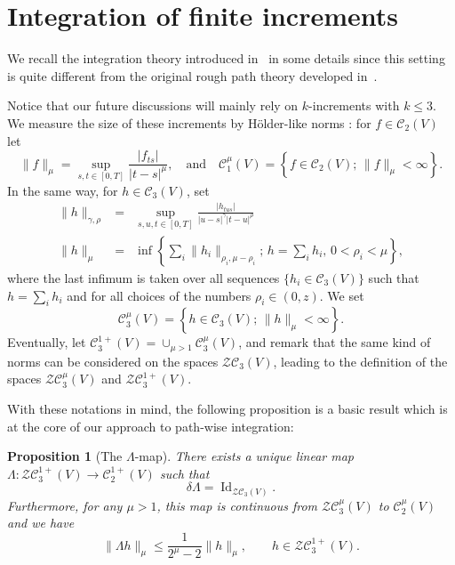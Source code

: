 \documentclass[a4paper,11pt,reqno]{article}
\newcommand{\cZ}{\mathcal{Z}}
\newcommand{\ott}{[0,T]}
\newcommand{\1}{{\bf 1}}
\DeclareMathOperator{\id}{\text{Id}}
\newcommand{\CC}{\mathcal{C}}
\newcommand{\norm}[1]{\lVert #1\rVert}
\newcommand{\lcl}{\left\{}
\newcommand{\rcl}{\right\}}
\newtheorem{proposition}[theorem]{Proposition}
\begin{document}
\section{Integration of finite increments}
\label{sec:one-dim}

We recall the integration theory introduced in~\cite{MR2091358} in
some details since this
setting is quite different from the original rough path
theory developed in~\cite{MR2036784,MR1654527}.

Notice that our future discussions will mainly rely on
$k$-increments with $k \le 3$. We measure the size of these increments by H\"older-like norms
: for $f \in \CC_2(V)$ let
$$
\norm{f}_{\mu} =
\sup_{s,t\in\ott}\frac{|f_{ts}|}{|t-s|^\mu},
\quad\mbox{and}\quad
\CC_1^\mu(V)=\lcl f \in \CC_2(V);\, \norm{f}_{\mu}<\infty  \rcl.
$$
In the same way, for $h \in \CC_3(V)$, set
\begin{eqnarray}
  \label{eq:normOCC2}
  \norm{h}_{\gamma,\rho} &=& \sup_{s,u,t\in\ott} 
\frac{|h_{tus}|}{|u-s|^\gamma |t-u|^\rho}\\
\|h\|_\mu &= &
\inf\left \{\sum_i \|h_i\|_{\rho_i,\mu-\rho_i} ;\, h =
 \sum_i h_i,\, 0 < \rho_i < \mu \right\} ,\nonumber
\end{eqnarray}
where the last infimum is taken over all sequences $\{h_i \in \CC_3(V) \}$ such that $h
= \sum_i h_i$ and for all choices of the numbers $\rho_i \in (0,z)$.
 We set
$$
\CC_3^\mu(V)=\lcl h\in\CC_3(V);\, \|h\|_\mu<\infty \rcl.
$$
Eventually,
let $\CC_3^{1+}(V) = \cup_{\mu > 1} \CC_3^\mu(V)$,
and remark that the same kind of norms can be considered on the
spaces $\cZ \CC_3(V)$, leading to the definition of the  spaces
$\cZ \CC_3^\mu(V)$ and $\cZ \CC_3^{1+}(V)$. 

\vspace{0.3cm}

With these notations in mind,
the following proposition is a basic result which is at the core of
 our approach to path-wise integration:
\begin{proposition}[The $\Lambda$-map]
\label{prop:Lambda}
There exists a unique linear map $\Lambda: \cZ \CC^{1+}_3(V)
\to \CC_2^{1+}(V)$ such that 
$$
\delta \Lambda  = \id_{\cZ \CC_3(V)}.
$$
Furthermore, for any $\mu > 1$, 
this map is continuous from $\cZ \CC^{\mu}_3(V)$
to $\CC_2^{\mu}(V)$ and we have
\begin{equation}\label{ineqla}
\|\Lambda h\|_{\mu} \le \frac{1}{2^\mu-2} \|h\|_{\mu} ,\qquad h \in  \cZ \CC^{1+}_3(V). 
\end{equation}
\end{proposition}
\end{document}
